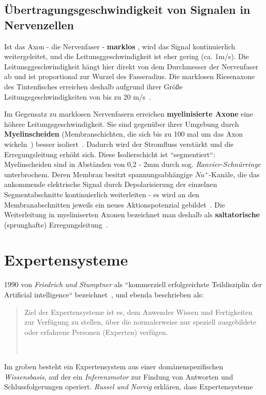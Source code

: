 {\subsection{Übertragungsgeschwindigkeit von Signalen in Nervenzellen}
Ist das Axon - die Nervenfaser - \textbf{marklos} , wird das Signal kontinuierlich weitergeleitet, und die Leitunsggeschwindigkeit ist eher gering (ca. 1m/s).
Die Leitunsggeschwindigkeit hängt hier direkt von dem Durchmesser der Nervenfaser ab und ist proportional zur Wurzel des Fasseradius.
Die marklosen Riesenaxone des Tintenfisches erreichen deshalb aufgrund ihrer Größe Leitungsgeschwindigkeiten von bis zu 20 m/s~\cite[79]{Jon19}.

Im Gegensatz zu marklosen Nervenfasern erreichen \textbf{myelinisierte Axone}  eine höhere Leitungsgeschwindigkeit.
Sie sind gegenüber ihrer Umgebung durch \textbf{Myelinscheiden}  (Membranschichten, die sich bis zu 100 mal um das Axon wickeln~\cite[79]{Jon19}) besser isoliert~\cite[48]{SD07}.
Dadurch wird der Stromfluss verstärkt und die Erregungsleitung erhöht sich.
Diese Isolierschicht ist ``segmentiert``: Myelinscheiden sind in Abständen von 0,2 - 2mm durch sog.  \textit{Ranvier-Schnürringe} unterbrochem.
Deren Membran besitzt spannungsabhängige $Na^+$-Kanäle, die das ankommende elektrische Signal durch  Depolarisierung der einzelnen Segmentabschnitte kontinuierlich weiterleiten - es wird an den Membranabschnitten jeweils ein neues Aktionspotenzial gebildet~\cite[48]{SD07}.
Die Weiterleitung in myeliniserten Axonen bezeichnet man deshalb als \textbf{saltatorische} (sprunghafte) Erregungsleitung~\cite[109 f.]{BCP18}.


\section{Expertensysteme}\label{appendix:expertensystem}

1990 von \textit{Friedrich und Stumptner} als ``kommerziell erfolgreichste Teildisziplin der Artificial intelligence`` bezeichnet~\cite[14]{FS90}, und ebenda beschrieben als:

\blockquote[{~\cite[14]{FS90}}]{
    Ziel der Expertensysteme ist es, dem Anwender Wissen und Fertigkeiten zur Verfügung zu stellen, über die normalerweise nur speziell ausgebildete oder erfahrene Personen (Experten) verfügen.
}

\noindent
Im groben besteht ein Expertensystem aus einer domänenspezifischen \textit{Wissensbasis}, auf der ein \textit{Inferenzmotor} zur Findung von Antworten und Schlussfolgerungen operiert. \textit{Russel und Norvig} erklären, dass Expertensysteme

}
